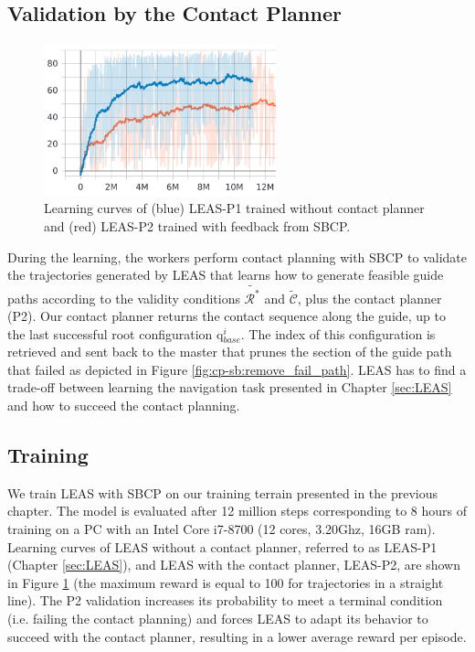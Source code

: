 \subsection{Validation by the Contact Planner}
\begin{figure}[t]
    \centering
    \includegraphics[width=0.6\textwidth]{Figures/Chapter_CPSB/learning_curve_p1_p2.png}
    \caption{Learning curves of (blue) LEAS-P1 trained without contact planner and (red) LEAS-P2 trained with feedback from SBCP.}
    \label{fig:cp-sb:learning_curves_p1_p2}
\end{figure}
During the learning, the workers perform contact planning with SBCP to validate the trajectories generated by LEAS that learns how to generate feasible guide paths according to the validity conditions $\tilde{\mathcal{R}^*}$ and $\tilde{\mathcal{C}}$, plus the contact planner (P2).
Our contact planner returns the contact sequence along the guide, up to the last successful root configuration q$_{base}^i$.
The index of this configuration is retrieved and sent back to the master that prunes the section of the guide path that failed as depicted in Figure \ref{fig:cp-sb:remove_fail_path}.
LEAS has to find a trade-off between learning the navigation task presented in Chapter \ref{sec:LEAS} and how to succeed the contact planning.

\subsection{Training}
We train LEAS with SBCP on our training terrain presented in the previous chapter.
The model is evaluated after 12 million steps corresponding to 8 hours of training on a PC with an Intel Core i7-8700 (12 cores, 3.20Ghz, 16GB ram). 
Learning curves of LEAS without a contact planner, referred to as LEAS-P1 (Chapter \ref{sec:LEAS}), and LEAS with the contact planner, LEAS-P2, are shown in Figure \ref{fig:cp-sb:learning_curves_p1_p2} (the maximum reward is equal to 100 for trajectories in a straight line). 
The P2 validation increases its probability to meet a terminal condition (i.e. failing the contact planning) and forces LEAS to adapt its behavior to succeed with the contact planner, resulting in a lower average reward per episode.

